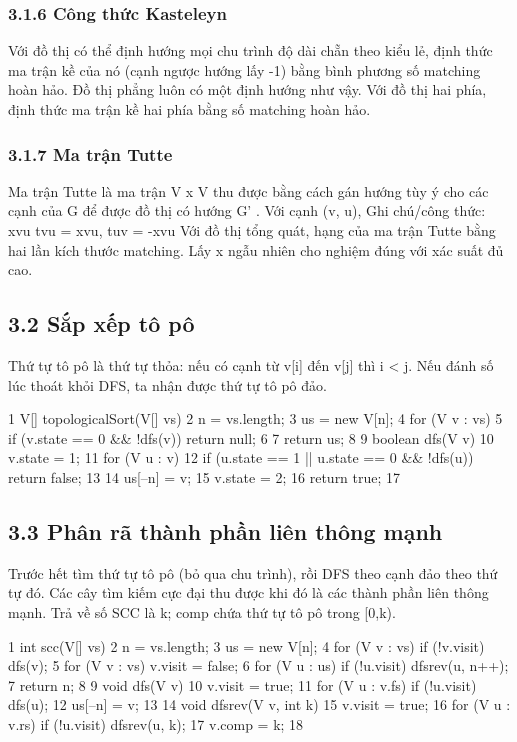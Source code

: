 \documentclass[11pt]{article}
\begin{document}
\subsubsection{3.1.6 Công thức Kasteleyn}
\begin{NoteBlock}
Với đồ thị có thể định hướng mọi chu trình độ dài chẵn theo kiểu lẻ, định thức ma trận kề của nó (cạnh ngược hướng lấy -1)
bằng bình phương số matching hoàn hảo.
Đồ thị phẳng luôn có một định hướng như vậy.
Với đồ thị hai phía, định thức ma trận kề hai phía bằng số matching hoàn hảo.
\end{NoteBlock}
\subsubsection{3.1.7 Ma trận Tutte}
\begin{NoteBlock}
Ma trận Tutte là ma trận V x V thu được bằng cách gán hướng tùy ý cho các cạnh của G để được đồ thị có hướng G' .
Với cạnh (v, u),
Ghi chú/công thức: xvu  tvu = xvu, tuv = -xvu
Với đồ thị tổng quát, hạng của ma trận Tutte bằng hai lần kích thước matching.
Lấy x ngẫu nhiên cho nghiệm đúng với xác suất đủ cao.
\end{NoteBlock}
\subsection{3.2 Sắp xếp tô pô}
\begin{NoteBlock}
Thứ tự tô pô là thứ tự thỏa: nếu có cạnh từ v[i] đến v[j] thì i < j.
Nếu đánh số lúc thoát khỏi DFS, ta nhận được thứ tự tô pô đảo.
\end{NoteBlock}
\begin{Code}
1 V[] topologicalSort(V[] vs) {
2 n = vs.length;
3 us = new V[n];
4 for (V v : vs) {
5 if (v.state == 0 && !dfs(v)) return null;
6 }
7 return us;
8 }
9 boolean dfs(V v) {
10 v.state = 1;
11 for (V u : v) {
12 if (u.state == 1 || u.state == 0 && !dfs(u)) return false;
13 }
14 us[--n] = v;
15 v.state = 2;
16 return true;
17 }
\end{Code}
\subsection{3.3 Phân rã thành phần liên thông mạnh}
\begin{NoteBlock}
Trước hết tìm thứ tự tô pô (bỏ qua chu trình), rồi DFS theo cạnh đảo theo thứ tự đó.
Các cây tìm kiếm cực đại thu được khi đó là các thành phần liên thông mạnh.
Trả về số SCC là k; comp chứa thứ tự tô pô trong [0,k).
\end{NoteBlock}
\begin{Code}
1 int scc(V[] vs) {
2 n = vs.length;
3 us = new V[n];
4 for (V v : vs) if (!v.visit) dfs(v);
5 for (V v : vs) v.visit = false;
6 for (V u : us) if (!u.visit) dfsrev(u, n++);
7 return n;
8 }
9 void dfs(V v) {
10 v.visit = true;
11 for (V u : v.fs) if (!u.visit) dfs(u);
12 us[--n] = v;
13 }
14 void dfsrev(V v, int k) {
15 v.visit = true;
16 for (V u : v.rs) if (!u.visit) dfsrev(u, k);
17 v.comp = k;
18 }
\end{Code}
\end{document}
